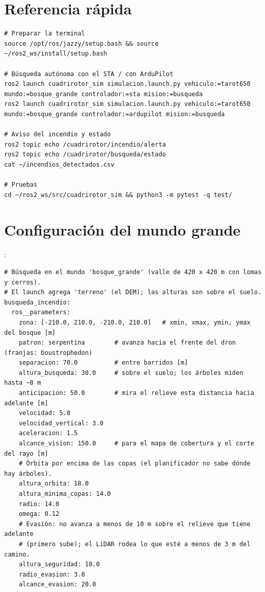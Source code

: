 \chapter{Referencia rápida}

\begin{lstlisting}[style=bash]
# Preparar la terminal
source /opt/ros/jazzy/setup.bash && source ~/ros2_ws/install/setup.bash

# Búsqueda autónoma con el STA / con ArduPilot
ros2 launch cuadrirotor_sim simulacion.launch.py vehiculo:=tarot650 mundo:=bosque_grande controlador:=sta mision:=busqueda
ros2 launch cuadrirotor_sim simulacion.launch.py vehiculo:=tarot650 mundo:=bosque_grande controlador:=ardupilot mision:=busqueda

# Aviso del incendio y estado
ros2 topic echo /cuadrirotor/incendio/alerta
ros2 topic echo /cuadrirotor/busqueda/estado
cat ~/incendios_detectados.csv

# Pruebas
cd ~/ros2_ws/src/cuadrirotor_sim && python3 -m pytest -q test/
\end{lstlisting}

\chapter{Configuración del mundo grande}

:
\begin{lstlisting}
# Búsqueda en el mundo 'bosque_grande' (valle de 420 x 420 m con lomas y cerros).
# El launch agrega 'terreno' (el DEM); las alturas son sobre el suelo.
busqueda_incendio:
  ros__parameters:
    zona: [-210.0, 210.0, -210.0, 210.0]   # xmin, xmax, ymin, ymax del bosque [m]
    patron: serpentina        # avanza hacia el frente del dron (franjas: boustrophedon)
    separacion: 70.0          # entre barridos [m]
    altura_busqueda: 30.0     # sobre el suelo; los árboles miden hasta ~8 m
    anticipacion: 50.0        # mira el relieve esta distancia hacia adelante [m]
    velocidad: 5.0
    velocidad_vertical: 3.0
    aceleracion: 1.5
    alcance_vision: 150.0     # para el mapa de cobertura y el corte del rayo [m]
    # Órbita por encima de las copas (el planificador no sabe dónde hay árboles).
    altura_orbita: 18.0
    altura_minima_copas: 14.0
    radio: 14.0
    omega: 0.12
    # Evasión: no avanza a menos de 10 m sobre el relieve que tiene adelante
    # (primero sube); el LiDAR rodea lo que esté a menos de 3 m del camino.
    altura_seguridad: 10.0
    radio_evasion: 3.0
    alcance_evasion: 20.0
\end{lstlisting}


